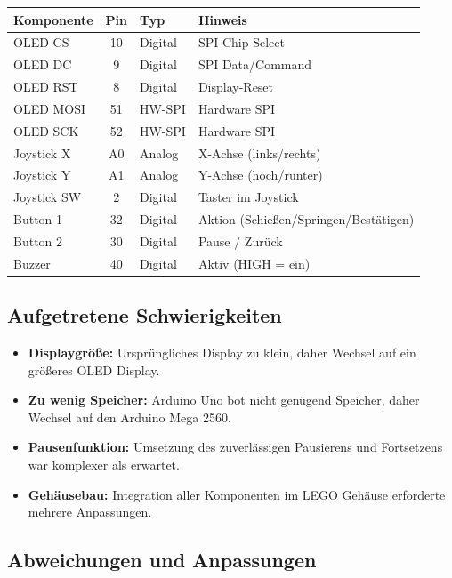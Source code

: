 \documentclass[12pt,a4paper]{article}
\begin{document}
\vspace{0.2cm}
\begin{tabularx}{\textwidth}{|l|c|l|X|}
\hline
\textbf{Komponente} & \textbf{Pin} & \textbf{Typ} & \textbf{Hinweis} \\
\hline
OLED CS   & 10 & Digital & SPI Chip-Select \\
OLED DC   &  9 & Digital & SPI Data/Command \\
OLED RST  &  8 & Digital & Display-Reset \\
OLED MOSI & 51 & HW-SPI  & Hardware SPI \\
OLED SCK  & 52 & HW-SPI  & Hardware SPI \\
Joystick X & A0 & Analog  & X-Achse (links/rechts) \\
Joystick Y & A1 & Analog  & Y-Achse (hoch/runter) \\
Joystick SW&  2 & Digital & Taster im Joystick \\
Button 1   & 32 & Digital & Aktion (Schießen/Springen/Bestätigen) \\
Button 2   & 30 & Digital & Pause / Zurück \\
Buzzer     & 40 & Digital & Aktiv (HIGH = ein) \\
\hline
\end{tabularx}

\subsection{Aufgetretene Schwierigkeiten}

\begin{itemize}[leftmargin=*,noitemsep]
\item \textbf{Displaygröße:} Ursprüngliches Display zu klein, daher Wechsel auf ein größeres OLED Display.
\item \textbf{Zu wenig Speicher:} Arduino Uno bot nicht genügend Speicher, daher Wechsel auf den Arduino Mega 2560.
\item \textbf{Pausenfunktion:} Umsetzung des zuverlässigen Pausierens und Fortsetzens war komplexer als erwartet.
\item \textbf{Gehäusebau:} Integration aller Komponenten im LEGO Gehäuse erforderte mehrere Anpassungen.
\end{itemize}

\subsection{Abweichungen und Anpassungen}
\end{document}
